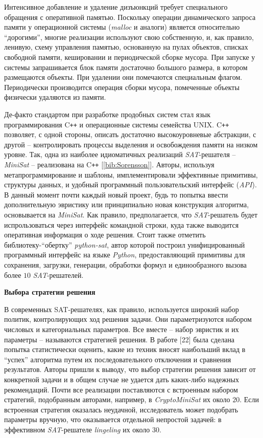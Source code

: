 Интенсивное добавление и удаление дизъюнкций требует специального обращения с оперативной памятью. Поскольку операции динамического запроса памяти у операционной системы (\textit{malloc} и аналоги) является относительно \enquote{дорогими}, многие реализации используют свою собственную, и, как правило, ленивую, схему управления памятью, основанную на пулах объектов, списках свободной памяти, кешировании и периодической сборке мусора. При запуске у системы запрашивается блок памяти достаточно большого размера, в котором размещаются объекты. При удалении они помечаются специальным флагом. Периодически производится операция сборки мусора, помеченные объекты физически удаляются из памяти.

Де-факто стандартом при разработке продобных систем стал язык программирования C\texttt{++} и операционные системы семейства UNIX.
C\texttt{++} позволяет, с одной стороны, описать достаточно высокоуровневые абстракции, с другой – контролировать процессы выделения и освобождения памяти на низком уровне. Так, одна из наиболее идиоматичных реализаций \textit{SAT}-решателя – \textit{MiniSat} – реализована на C\texttt{++} [\ref{bib:Sorensson}]. Авторы, используя метапрограммирование и шаблоны, имплементировали эффективные примитивы, структуры данных, и удобный программный пользовательский интерфейс (\textit{API}). В данный момент почти каждый новый проект, будь то попытка ввести дополнительную эвристику или принципиально новая конструкция алгоритма, основывается на \textit{MiniSat}. Как правило, предполагается, что \textit{SAT}-решатель будет испрользоваться через интерфейс командной строки, куда также выводится оперативная информация о ходе решения. Стоит также отметить библиотеку-\enquote{обертку} \textit{python-sat}, автор которой построил унифицированный программный интерфейс на языке \textit{Python}, предоставляющий примитивы для сохранения, загрузки, генерации, обработки формул и единообразного вызова более $10$ \textit{SAT}-решателей.

\textbf{Выбора стратегии решения}

В современных SAT-решателях, как правило, используется широкий набор политик, контролирующих ход решения задачи. Они параметризуются набором числовых и категориальных параметров. Все вместе – набор эвристик и их параметры – называются стратегией решения. В работе [22] была сделана попытка статистически оценить, какие из техник вносят наибольший вклад в \enquote{успех} алгоритма путем их последовательного отключения и сравнения результатов. Авторы пришли к выводу, что выбор стратегии решения зависит от конкретной задачи и в общем случае не удается дать каких-либо надежных рекомендаций. Почти все реализации поставляются с встроенным набором стратегий, подобранным авторами, 
например, в \textit{CryptoMiniSat} их около $20$. Если встроенная стратегия оказалась неудачной, исследователь может подобрать параметры вручную, что оказывается отдельной непростой задачей: в эффективном \textit{SAT}-решателе \textit{lingeling} их около 30.

